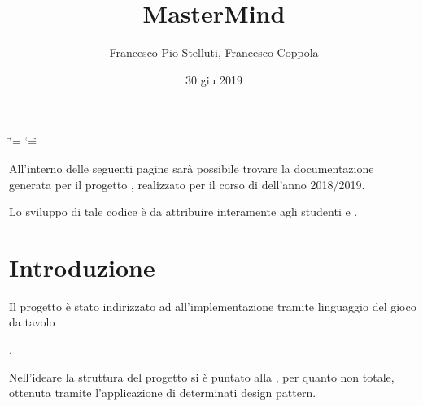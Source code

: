 \documentclass[letterpaper,10pt,italian,openany,oneside]{sphinxmanual}
\title{MasterMind}
\date{30 giu 2019}
\author{Francesco Pio Stelluti, Francesco Coppola}
\begin{document}
\ifdefined\shorthandoff
  \ifnum\catcode`\=\string=\active\shorthandoff{=}\fi
  \ifnum\catcode`\"=\active{}\fi
\fi

\pagestyle{empty}
\sphinxmaketitle
\pagestyle{plain}
\sphinxtableofcontents
\pagestyle{normal}
\label{\detokenize{index::doc}}

\begin{quote}

\begin{quote}

\begin{footnote}[1]\sphinxAtStartFootnote
{}
%
\end{footnote}
\end{quote}
\end{quote}

All’interno delle seguenti pagine sarà possibile trovare la documentazione
generata per il progetto , realizzato per il corso di 
dell’anno 2018/2019.

Lo sviluppo di tale codice è da attribuire interamente agli studenti  e .


\chapter{Introduzione}
\label{\detokenize{introduzione:introduzione}}\label{\detokenize{introduzione::doc}}
Il progetto è stato indirizzato ad all’implementazione tramite linguaggio 
del gioco da tavolo  %
\begin{footnote}[1]\sphinxAtStartFootnote
{}
%
\end{footnote}.

Nell’ideare la struttura del progetto si è puntato
alla , per quanto non totale, ottenuta tramite l’applicazione
di determinati design pattern.
\end{document}
